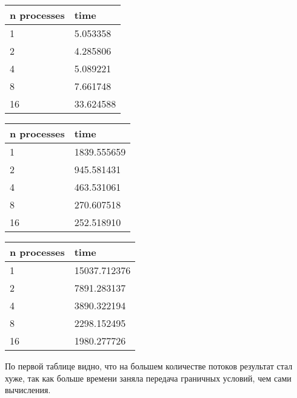 \documentclass[12pt]{article}
\begin{document}
\begin{table*}[!ht]
	\begin{minipage}{.49\linewidth}
		\centering
		\caption*{Область 8x8x8, точность $1e^{-10}$}
		\begin{tabularx}{\linewidth}{|X|X|}
			\hline
			n processes & time      \\
			\hline
			1           & 5.053358  \\
			2           & 4.285806  \\
			4           & 5.089221  \\
			8           & 7.661748  \\
			16          & 33.624588 \\
			\hline
		\end{tabularx}
	\end{minipage}%
	\begin{minipage}{.49\linewidth}
		\centering
		\caption*{Область 64x64x64, точность $1e^{-2}$}
		\begin{tabularx}{\linewidth}{|X|X|}
			\hline
			n processes & time        \\
			\hline
			1           & 1839.555659 \\
			2           & 945.581431  \\
			4           & 463.531061  \\
			8           & 270.607518  \\
			16          & 252.518910  \\
			\hline
		\end{tabularx}
	\end{minipage}

	\begin{minipage}{.49\linewidth}
		\centering
		\caption*{Область 128x128x128, точность $1e^{-2}$}
		\begin{tabularx}{\linewidth}{|X|X|}
			\hline
			n processes & time         \\
			\hline
			1           & 15037.712376 \\
			2           & 7891.283137  \\
			4           & 3890.322194  \\
			8           & 2298.152495  \\
			16          & 1980.277726  \\
			\hline
		\end{tabularx}
	\end{minipage}%
\end{table*}

По первой таблице видно, что на большем количестве потоков результат стал хуже,
так как больше времени заняла передача граничных условий, чем сами вычисления.
\end{document}
